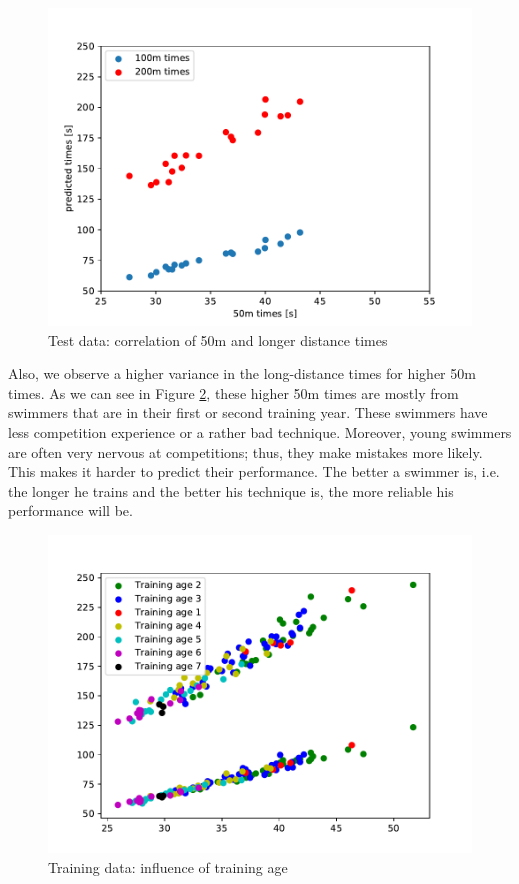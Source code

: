 \begin{figure}[ht]
    \centering
    \includegraphics[scale=0.5]{visualisation/test_data.pdf}
    \caption{Test data: correlation of 50m and longer distance times}
    \label{fig:test_data}
\end{figure}
Also, we observe a higher variance in the long-distance times for higher 50m times. As we can see in Figure \ref{fig:training_age}, these higher 50m times are mostly from swimmers that are in their first or second training year. These swimmers have less competition experience or a rather bad technique. Moreover, young swimmers are often very nervous at competitions; thus, they make mistakes more likely. This makes it harder to predict their performance. The better a swimmer is, i.e. the longer he trains and the better his technique is, the more reliable his performance will be.
\begin{figure}[ht]
    \centering
    \includegraphics[scale=0.5]{visualisation/training_data_train_ages.pdf}
    \caption{Training data: influence of training age}
    \label{fig:training_age}
\end{figure}